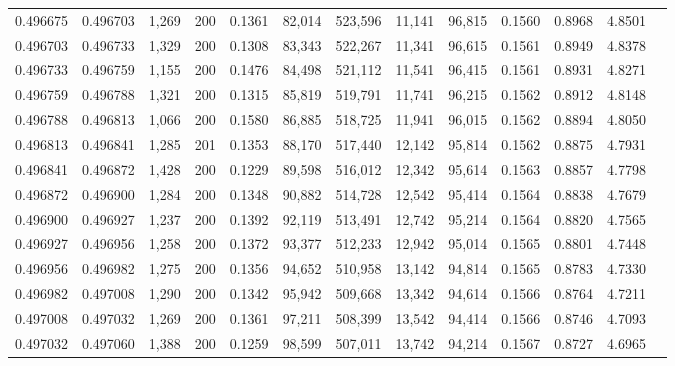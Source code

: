 \begin{tabular}{rrrrrrrrrrrrr}
0.496675 & 0.496703 & 1,269 & 200 &                                     0.1361 &  82,014 & 523,596 &  11,141 &  96,815 & 0.1560 & 0.8968 & 4.8501 \\
0.496703 & 0.496733 & 1,329 & 200 &                                     0.1308 &  83,343 & 522,267 &  11,341 &  96,615 & 0.1561 & 0.8949 & 4.8378 \\
0.496733 & 0.496759 & 1,155 & 200 &                                     0.1476 &  84,498 & 521,112 &  11,541 &  96,415 & 0.1561 & 0.8931 & 4.8271 \\
0.496759 & 0.496788 & 1,321 & 200 &                                     0.1315 &  85,819 & 519,791 &  11,741 &  96,215 & 0.1562 & 0.8912 & 4.8148 \\
0.496788 & 0.496813 & 1,066 & 200 &                                     0.1580 &  86,885 & 518,725 &  11,941 &  96,015 & 0.1562 & 0.8894 & 4.8050 \\
0.496813 & 0.496841 & 1,285 & 201 &                                     0.1353 &  88,170 & 517,440 &  12,142 &  95,814 & 0.1562 & 0.8875 & 4.7931 \\
0.496841 & 0.496872 & 1,428 & 200 &                                     0.1229 &  89,598 & 516,012 &  12,342 &  95,614 & 0.1563 & 0.8857 & 4.7798 \\
0.496872 & 0.496900 & 1,284 & 200 &                                     0.1348 &  90,882 & 514,728 &  12,542 &  95,414 & 0.1564 & 0.8838 & 4.7679 \\
0.496900 & 0.496927 & 1,237 & 200 &                                     0.1392 &  92,119 & 513,491 &  12,742 &  95,214 & 0.1564 & 0.8820 & 4.7565 \\
0.496927 & 0.496956 & 1,258 & 200 &                                     0.1372 &  93,377 & 512,233 &  12,942 &  95,014 & 0.1565 & 0.8801 & 4.7448 \\
0.496956 & 0.496982 & 1,275 & 200 &                                     0.1356 &  94,652 & 510,958 &  13,142 &  94,814 & 0.1565 & 0.8783 & 4.7330 \\
0.496982 & 0.497008 & 1,290 & 200 &                                     0.1342 &  95,942 & 509,668 &  13,342 &  94,614 & 0.1566 & 0.8764 & 4.7211 \\
0.497008 & 0.497032 & 1,269 & 200 &                                     0.1361 &  97,211 & 508,399 &  13,542 &  94,414 & 0.1566 & 0.8746 & 4.7093 \\
0.497032 & 0.497060 & 1,388 & 200 &                                     0.1259 &  98,599 & 507,011 &  13,742 &  94,214 & 0.1567 & 0.8727 & 4.6965 \\

\end{tabular}

